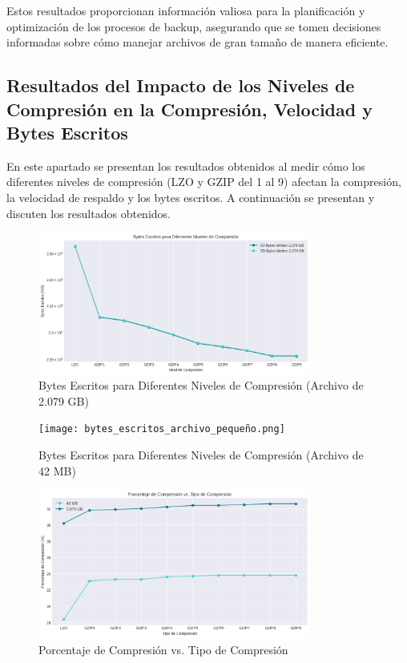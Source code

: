 Estos resultados proporcionan información valiosa para la planificación y optimización de los procesos de backup, asegurando que se tomen decisiones informadas sobre cómo manejar archivos de gran tamaño de manera eficiente.


\subsection{Resultados del Impacto de los Niveles de Compresión en la Compresión, Velocidad y Bytes Escritos}

En este apartado se presentan los resultados obtenidos al medir cómo los diferentes niveles de compresión (LZO y GZIP del 1 al 9) afectan la compresión, la velocidad de respaldo y los bytes escritos. A continuación se presentan y discuten los resultados obtenidos.

\begin{figure}[H]
    \centering
    \includegraphics[width=0.8\textwidth]{bytes_escritos_archivo_grande.png}
    \caption{Bytes Escritos para Diferentes Niveles de Compresión (Archivo de 2.079 GB)}
    \label{fig:bytes_escritos_grande}
\end{figure}

\begin{figure}[H]
    \centering
    \texttt{[image: bytes\_escritos\_archivo\_pequeño.png]}
    \caption{Bytes Escritos para Diferentes Niveles de Compresión (Archivo de 42 MB)}
    \label{fig:bytes_escritos_pequeño}
\end{figure}

\begin{figure}[H]
    \centering
    \includegraphics[width=0.8\textwidth]{porcentaje_compresion.png}
    \caption{Porcentaje de Compresión vs. Tipo de Compresión}
    \label{fig:porcentaje_compresion}
\end{figure}


